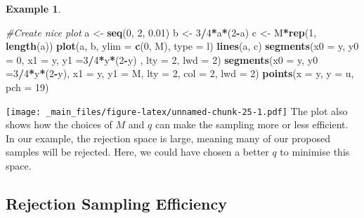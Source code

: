 \documentclass[
]{book}
\newenvironment{Shaded}{\begin{snugshade}}{\end{snugshade}}
\newcommand{\AttributeTok}[1]{\textcolor[rgb]{0.13,0.29,0.53}{#1}}
\newcommand{\CommentTok}[1]{\textcolor[rgb]{0.56,0.35,0.01}{\textit{#1}}}
\newcommand{\DecValTok}[1]{\textcolor[rgb]{0.00,0.00,0.81}{#1}}
\newcommand{\FloatTok}[1]{\textcolor[rgb]{0.00,0.00,0.81}{#1}}
\newcommand{\FunctionTok}[1]{\textcolor[rgb]{0.13,0.29,0.53}{\textbf{#1}}}
\newcommand{\NormalTok}[1]{#1}
\newcommand{\OtherTok}[1]{\textcolor[rgb]{0.56,0.35,0.01}{#1}}
\newcommand{\SpecialCharTok}[1]{\textcolor[rgb]{0.81,0.36,0.00}{\textbf{#1}}}
\newcommand{\StringTok}[1]{\textcolor[rgb]{0.31,0.60,0.02}{#1}}
\theoremstyle{definition}
\theoremstyle{definition}
\newtheorem{example}{Example}[chapter]
\theoremstyle{definition}
\theoremstyle{definition}
\theoremstyle{remark}
\begin{document}
\begin{example}
\begin{Shaded}
\begin{Highlighting}[]
\CommentTok{\#Create nice plot}
\NormalTok{a }\OtherTok{\textless{}{-}} \FunctionTok{seq}\NormalTok{(}\DecValTok{0}\NormalTok{, }\DecValTok{2}\NormalTok{, }\FloatTok{0.01}\NormalTok{)}
\NormalTok{b }\OtherTok{\textless{}{-}} \DecValTok{3}\SpecialCharTok{/}\DecValTok{4}\SpecialCharTok{*}\NormalTok{a}\SpecialCharTok{*}\NormalTok{(}\DecValTok{2}\SpecialCharTok{{-}}\NormalTok{a)}
\NormalTok{c }\OtherTok{\textless{}{-}}\NormalTok{ M}\SpecialCharTok{*}\FunctionTok{rep}\NormalTok{(}\DecValTok{1}\NormalTok{, }\FunctionTok{length}\NormalTok{(a))}
\FunctionTok{plot}\NormalTok{(a, b, }\AttributeTok{ylim =} \FunctionTok{c}\NormalTok{(}\DecValTok{0}\NormalTok{, M), }\AttributeTok{type =} \StringTok{\textquotesingle{}l\textquotesingle{}}\NormalTok{)}
\FunctionTok{lines}\NormalTok{(a, c)}
\FunctionTok{segments}\NormalTok{(}\AttributeTok{x0 =}\NormalTok{ y, }\AttributeTok{y0 =} \DecValTok{0}\NormalTok{, }\AttributeTok{x1 =}\NormalTok{ y,  }\AttributeTok{y1 =}\DecValTok{3}\SpecialCharTok{/}\DecValTok{4}\SpecialCharTok{*}\NormalTok{y}\SpecialCharTok{*}\NormalTok{(}\DecValTok{2}\SpecialCharTok{{-}}\NormalTok{y) , }
          \AttributeTok{lty =} \DecValTok{2}\NormalTok{, }\AttributeTok{lwd =} \DecValTok{2}\NormalTok{)}
\FunctionTok{segments}\NormalTok{(}\AttributeTok{x0 =}\NormalTok{ y,  }\AttributeTok{y0 =}\DecValTok{3}\SpecialCharTok{/}\DecValTok{4}\SpecialCharTok{*}\NormalTok{y}\SpecialCharTok{*}\NormalTok{(}\DecValTok{2}\SpecialCharTok{{-}}\NormalTok{y), }\AttributeTok{x1 =}\NormalTok{ y, }\AttributeTok{y1 =}\NormalTok{ M, }\AttributeTok{lty =} \DecValTok{2}\NormalTok{, }
          \AttributeTok{col =} \DecValTok{2}\NormalTok{, }\AttributeTok{lwd =} \DecValTok{2}\NormalTok{)}
\FunctionTok{points}\NormalTok{(}\AttributeTok{x =}\NormalTok{ y, }\AttributeTok{y =}\NormalTok{ u, }\AttributeTok{pch =} \DecValTok{19}\NormalTok{)}
\end{Highlighting}
\end{Shaded}

\texttt{[image: \_main\_files/figure-latex/unnamed-chunk-25-1.pdf]}
The plot also shows how the choices of \(M\) and \(q\) can make the sampling more or less efficient. In our example, the rejection space is large, meaning many of our proposed samples will be rejected. Here, we could have chosen a better \(q\) to minimise this space.
\end{example}

\hypertarget{rejection-sampling-efficiency}{%
\subsection{Rejection Sampling Efficiency}\label{rejection-sampling-efficiency}}
\end{document}
